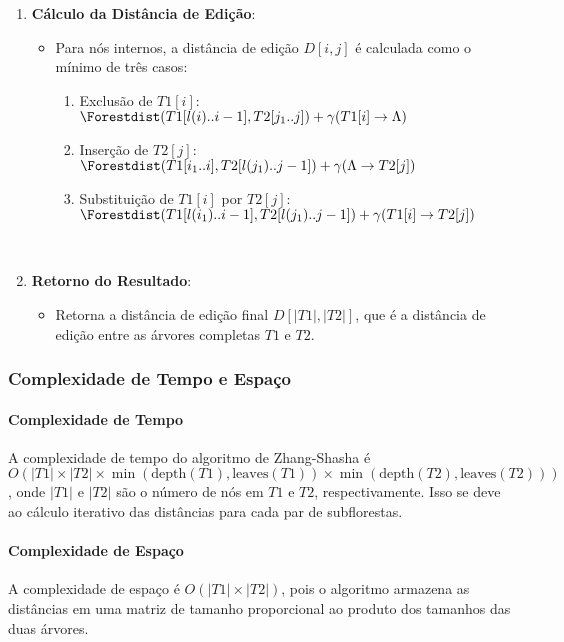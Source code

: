 \documentclass[12pt]{article}
\begin{document}
\begin{enumerate}
    \item \textbf{Cálculo da Distância de Edição}:
    \begin{itemize}
        \item Para nós internos, a distância de edição $D[i, j]$ é calculada como o mínimo de três casos:
        \begin{enumerate}
            \item Exclusão de $T1[i]$: $\Forestdist(T1[l(i)..i-1], T2[j_1..j]) + \gamma(T1[i] \to \Lambda)$
            \item Inserção de $T2[j]$: $\Forestdist(T1[i_1..i], T2[l(j_1)..j-1]) + \gamma(\Lambda \to T2[j])$\\
            \item Substituição de $T1[i]$ por $T2[j]$: $\Forestdist(T1[l(i_1)..i-1], T2[l(j_1)..j-1]) + \gamma(T1[i] \to T2[j])$\\
        \end{enumerate}
    \end{itemize}
    \\
    \item \textbf{Retorno do Resultado}:
    \begin{itemize}
        \item Retorna a distância de edição final $D[|T1|, |T2|]$, que é a distância de edição entre as árvores completas $T1$ e $T2$.
    \end{itemize}
\end{enumerate}



\subsubsection{Complexidade de Tempo e Espaço}

\paragraph{Complexidade de Tempo}
A complexidade de tempo do algoritmo de Zhang-Shasha é \(O(|T1| \times |T2| \times \min(\text{depth}(T1), \text{leaves}(T1)) \times \min(\text{depth}(T2), \text{leaves}(T2)))\), onde \(|T1|\) e \(|T2|\) são o número de nós em \(T1\) e \(T2\), respectivamente. Isso se deve ao cálculo iterativo das distâncias para cada par de subflorestas.

\paragraph{Complexidade de Espaço}
A complexidade de espaço é \(O(|T1| \times |T2|)\), pois o algoritmo armazena as distâncias em uma matriz de tamanho proporcional ao produto dos tamanhos das duas árvores.
\end{document}
